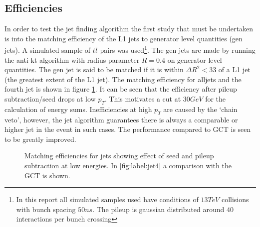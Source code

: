 \subsection{Efficiencies}
In 
order to test the jet finding algorithm the first study that must be undertaken is 
into the matching efficiency of the L1 jets to generator level quantities (gen jets). A 
simulated sample of $t\bar{t}$ pairs was used\footnote{In this report all simulated samples used have conditions 
of $13TeV$ collisions with bunch spacing $50ns$. The pileup is gaussian distributed around $40$ interactions 
per bunch crossing}. The gen jets are made by running the anti-kt algorithm with radius 
parameter $R=0.4$ on generator level quantities. The gen jet is said to be matched if 
it is within ${\Delta R}^2<33$ of a L1 jet (the greatest extent of the L1 
jet). The matching efficiency for alljets and the fourth jet is shown in figure \ref{match}. 
It can be seen that the efficiency after pileup subtraction/seed drops at low $p_T$. This 
motivates a cut at $30GeV$ for the calculation of energy sums. Inefficiencies at high $p_T$ 
are caused by the `chain veto', however, the jet algorithm guarantees there is always a 
comparable or higher jet in the event in such cases. The performance compared to GCT 
is seen to be greatly improved.  
\begin{figure}
\hfill
{}
\hfill
{}
\hfill
\caption{Matching 
efficiencies for jets showing effect of seed and pileup subtraction at low energies. In \ref{fig:label:jet4} 
a comparison with the GCT is shown.}
\label{match}
\end{figure}
